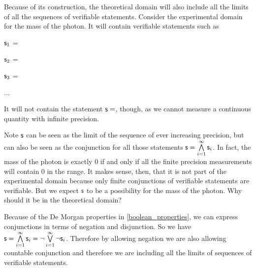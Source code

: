 \documentclass[11pt,letterpaper,fleqn]{memoir} %
\begin{document}
Because of its construction, the theoretical domain will also include all the limits of all the sequences of verifiable statements. Consider the experimental domain for the mass of the photon. It will contain verifiable statements such as
\begin{description}
	\item $\mathsf{s}_1$ =
	\item $\mathsf{s}_2$ =
	\item $\mathsf{s}_3$ =
	\item ...
\end{description}
It will not contain the statement $\mathsf{s}=$, though, as we cannot measure a continuous quantity with infinite precision.

Note $\mathsf{s}$ can be seen as the limit of the sequence of ever increasing precision, but can also be seen as the conjunction for all those statements $\mathsf{s}=\bigwedge\limits_{i=1}^{\infty} \mathsf{s}_i$. In fact, the mass of the photon is exactly 0 if and only if all the finite precision measurements will contain 0 in the range. It makes sense, then, that it is not part of the experimental domain because only finite conjunctions of verifiable statements are verifiable. But we expect $\mathsf{s}$ to be a possibility for the mass of the photon. Why should it be in the theoretical domain?

Because of the De Morgan properties in \ref{boolean_properties}, we can express conjunctions in terms of negation and disjunction. So we have $\mathsf{s}=\bigwedge\limits_{i=1}^{\infty} \mathsf{s}_i=\neg \bigvee\limits_{i=1}^{\infty} \neg\mathsf{s}_i$. Therefore by allowing negation we are also allowing countable conjunction and therefore we are including all the limits of sequences of verifiable statements.

\end{document}
